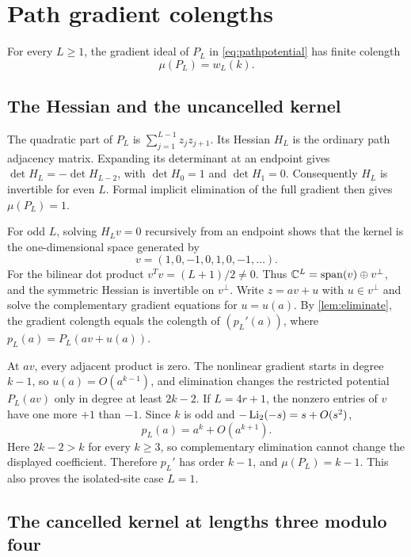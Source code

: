 \section{Path gradient colengths}\label{sec:paths}

\begin{proposition}\label{prop:paths}
For every $L\geq1$, the gradient ideal of $P_L$ in
\eqref{eq:pathpotential} has finite colength
\[
 \mu(P_L)=w_L(k).
\]
\end{proposition}

\subsection{The Hessian and the uncancelled kernel}

The quadratic part of $P_L$ is $\sum_{j=1}^{L-1}z_jz_{j+1}$.
Its Hessian $H_L$ is the ordinary path adjacency matrix. Expanding its
determinant at an endpoint gives
$\det H_L=-\det H_{L-2}$, with $\det H_0=1$ and $\det H_1=0$.
Consequently $H_L$ is invertible for even $L$. Formal implicit elimination
of the full gradient then gives $\mu(P_L)=1$.

For odd $L$, solving $H_Lv=0$ recursively from an endpoint shows that
the kernel is the one-dimensional space generated by
\begin{equation}\label{eq:pathkernel}
 v=(1,0,-1,0,1,0,-1,\ldots).
\end{equation}
For the bilinear dot product $v^Tv=(L+1)/2\ne0$. Thus
$\mathbb C^L=\operatorname{span}(v)\oplus v^\perp$, and the symmetric Hessian is invertible
on $v^\perp$. Write $z=av+u$ with $u\in v^\perp$ and solve the
complementary gradient equations for $u=u(a)$. By
\cref{lem:eliminate}, the gradient colength equals the colength of
$(p_L'(a))$, where $p_L(a)=P_L(av+u(a))$.

At $av$, every adjacent product is zero. The nonlinear gradient starts
in degree $k-1$, so $u(a)=O(a^{k-1})$, and elimination changes the
restricted potential $P_L(av)$ only in degree at least $2k-2$.
If $L=4r+1$, the nonzero entries of $v$ have one more $+1$ than $-1$.
Since $k$ is odd and $-\operatorname{Li}_2(-s)=s+O(s^2)$,
\begin{equation}\label{eq:pathuncancelled}
 p_L(a)=a^k+O(a^{k+1}).
\end{equation}
Here $2k-2>k$ for every $k\geq3$, so complementary elimination cannot
change the displayed coefficient. Therefore $p_L'$ has order $k-1$,
and $\mu(P_L)=k-1$. This also proves the isolated-site case $L=1$.

\subsection{The cancelled kernel at lengths three modulo four}

